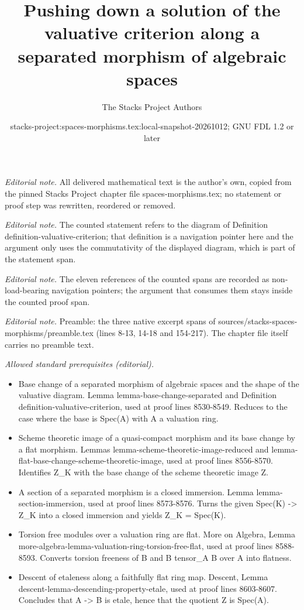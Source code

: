 \documentclass[10pt,a4paper]{amsart}
\title{Pushing down a solution of the valuative criterion along a separated morphism of algebraic spaces}
\author{The Stacks Project Authors}
\date{stacks-project:spaces-morphisms.tex:local-snapshot-20261012; GNU FDL 1.2 or later}
\theoremstyle{plain}
\theoremstyle{definition}
\theoremstyle{remark}
\numberwithin{equation}{subsection}
\begin{document}
\maketitle
\setcounter{subsection}{1}
\noindent\textit{Editorial note.} All delivered mathematical text is the author's own, copied from the pinned Stacks Project chapter file spaces-morphisms.tex; no statement or proof step was rewritten, reordered or removed.\par\medskip
\noindent\textit{Editorial note.} The counted statement refers to the diagram of Definition definition-valuative-criterion; that definition is a navigation pointer here and the argument only uses the commutativity of the displayed diagram, which is part of the statement span.\par\medskip
\noindent\textit{Editorial note.} The eleven references of the counted spans are recorded as non-load-bearing navigation pointers; the argument that consumes them stays inside the counted proof span.\par\medskip
\noindent\textit{Editorial note.} Preamble: the three native excerpt spans of sources/stacks-spaces-morphisms/preamble.tex (lines 8-13, 14-18 and 154-217). The chapter file itself carries no preamble text.\par\medskip
\noindent\textit{Allowed standard prerequisites (editorial).}\begin{itemize}
\item Base change of a separated morphism of algebraic spaces and the shape of the valuative diagram. Lemma lemma-base-change-separated and Definition definition-valuative-criterion, used at proof lines 8530-8549. Reduces to the case where the base is Spec(A) with A a valuation ring.
\item Scheme theoretic image of a quasi-compact morphism and its base change by a flat morphism. Lemmas lemma-scheme-theoretic-image-reduced and lemma-flat-base-change-scheme-theoretic-image, used at proof lines 8556-8570. Identifies Z\_K with the base change of the scheme theoretic image Z.
\item A section of a separated morphism is a closed immersion. Lemma lemma-section-immersion, used at proof lines 8573-8576. Turns the given Spec(K) -> Z\_K into a closed immersion and yields Z\_K = Spec(K).
\item Torsion free modules over a valuation ring are flat. More on Algebra, Lemma more-algebra-lemma-valuation-ring-torsion-free-flat, used at proof lines 8588-8593. Converts torsion freeness of B and B tensor\_A B over A into flatness.
\item Descent of etaleness along a faithfully flat ring map. Descent, Lemma descent-lemma-descending-property-etale, used at proof lines 8603-8607. Concludes that A -> B is etale, hence that the quotient Z is Spec(A).
\end{itemize}\medskip
\end{document}
